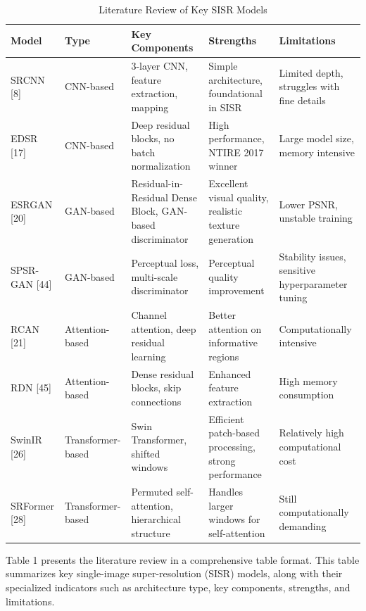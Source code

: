 \documentclass[twocolumn]{svjour3}          %
\begin{document}
\begin{table}
\centering
\caption{Literature Review of Key SISR Models}
\label{table:literature_review}
\begin{tabular}{|p{2cm}|p{2cm}|p{3cm}|p{3cm}|p{3cm}|}
\hline
\textbf{Model} & \textbf{Type} & \textbf{Key Components} & \textbf{Strengths} & \textbf{Limitations} \\
\hline
SRCNN [8] & CNN-based & 3-layer CNN, feature extraction, mapping & Simple architecture, foundational in SISR & Limited depth, struggles with fine details \\
\hline
EDSR [17] & CNN-based & Deep residual blocks, no batch normalization & High performance, NTIRE 2017 winner & Large model size, memory intensive \\
\hline
ESRGAN [20] & GAN-based & Residual-in-Residual Dense Block, GAN-based discriminator & Excellent visual quality, realistic texture generation & Lower PSNR, unstable training \\
\hline
SPSR-GAN [44] & GAN-based & Perceptual loss, multi-scale discriminator & Perceptual quality improvement & Stability issues, sensitive hyperparameter tuning \\
\hline
RCAN [21] & Attention-based & Channel attention, deep residual learning & Better attention on informative regions & Computationally intensive \\
\hline
RDN [45] & Attention-based & Dense residual blocks, skip connections & Enhanced feature extraction & High memory consumption \\
\hline
SwinIR [26] & Transformer-based & Swin Transformer, shifted windows & Efficient patch-based processing, strong performance & Relatively high computational cost \\
\hline
SRFormer [28] & Transformer-based & Permuted self-attention, hierarchical structure & Handles larger windows for self-attention & Still computationally demanding \\
\hline
\end{tabular}

\end{table}

Table 1 presents the literature review in a comprehensive table format. This table summarizes key single-image super-resolution (SISR) models, along with their specialized indicators such as architecture type, key components, strengths, and limitations.
\end{document}

